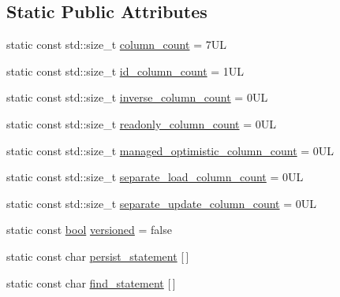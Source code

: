 \subsection*{Static Public Attributes}
\begin{DoxyCompactItemize}
\item 
static const std\+::size\+\_\+t \hyperlink{classodb_1_1access_1_1object__traits__impl_3_01_1_1_node_00_01id__pgsql_01_4_a612addb24265119234794b5e4a4ae316}{column\+\_\+count} = 7\+U\+L
\item 
static const std\+::size\+\_\+t \hyperlink{classodb_1_1access_1_1object__traits__impl_3_01_1_1_node_00_01id__pgsql_01_4_a4f4e9fbc78ec3ac544c6e3be96caecf4}{id\+\_\+column\+\_\+count} = 1\+U\+L
\item 
static const std\+::size\+\_\+t \hyperlink{classodb_1_1access_1_1object__traits__impl_3_01_1_1_node_00_01id__pgsql_01_4_a49f89e7cd3e6220827479422e82a18ca}{inverse\+\_\+column\+\_\+count} = 0\+U\+L
\item 
static const std\+::size\+\_\+t \hyperlink{classodb_1_1access_1_1object__traits__impl_3_01_1_1_node_00_01id__pgsql_01_4_a39ff7c0647ada3fa9e0308b790382985}{readonly\+\_\+column\+\_\+count} = 0\+U\+L
\item 
static const std\+::size\+\_\+t \hyperlink{classodb_1_1access_1_1object__traits__impl_3_01_1_1_node_00_01id__pgsql_01_4_a14d9b3b4db1199a0831c082c4a950114}{managed\+\_\+optimistic\+\_\+column\+\_\+count} = 0\+U\+L
\item 
static const std\+::size\+\_\+t \hyperlink{classodb_1_1access_1_1object__traits__impl_3_01_1_1_node_00_01id__pgsql_01_4_a45f3c75caf4038dc8d2cf8053f9cb2aa}{separate\+\_\+load\+\_\+column\+\_\+count} = 0\+U\+L
\item 
static const std\+::size\+\_\+t \hyperlink{classodb_1_1access_1_1object__traits__impl_3_01_1_1_node_00_01id__pgsql_01_4_a30dfa70e7d99a364dbca928ff6a1cb97}{separate\+\_\+update\+\_\+column\+\_\+count} = 0\+U\+L
\item 
static const \hyperlink{classodb_1_1access_1_1object__traits_3_01_1_1_node_01_4_a432d6a340380ba002f9f3a4ef369ad3b}{bool} \hyperlink{classodb_1_1access_1_1object__traits__impl_3_01_1_1_node_00_01id__pgsql_01_4_aaff6098d1d63663a5ff279cfcc746eec}{versioned} = false
\item 
static const char \hyperlink{classodb_1_1access_1_1object__traits__impl_3_01_1_1_node_00_01id__pgsql_01_4_afe76875112868556f171836fe98d3a40}{persist\+\_\+statement} \mbox{[}$\,$\mbox{]}
\item 
static const char \hyperlink{classodb_1_1access_1_1object__traits__impl_3_01_1_1_node_00_01id__pgsql_01_4_a8acb6b2877a0130c469ce14bf3dc1f62}{find\+\_\+statement} \mbox{[}$\,$\mbox{]}

\end{DoxyCompactItemize}

